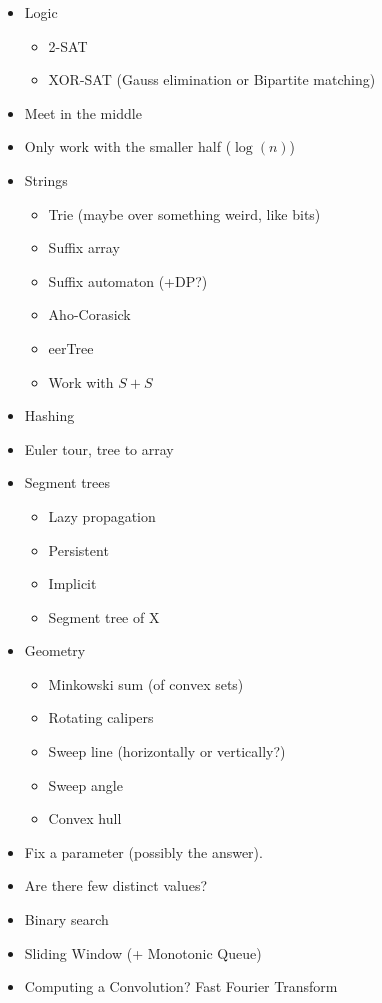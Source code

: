\documentclass[9pt,a4paper,landscape,oneside]{amsart}
\newenvironment{myitemize}
{\begin{itemize}[leftmargin=.3cm]
	\setlength{\itemsep}{0pt}
	\setlength{\parskip}{0pt}
	\setlength{\parsep}{0pt}     }
{ \end{itemize}                  }
\begin{document}
\begin{multicols*}{3}
\begin{myitemize}
\begin{myitemize}
		\end{myitemize}
	\item Logic
		\begin{myitemize}
			\item 2-SAT
			\item XOR-SAT (Gauss elimination or Bipartite matching)
		\end{myitemize}
	\item Meet in the middle
	\item Only work with the smaller half ($\log(n)$)
	\item Strings
		\begin{myitemize}
			\item Trie (maybe over something weird, like bits)
			\item Suffix array
			\item Suffix automaton (+DP?)
			\item Aho-Corasick
			\item eerTree
			\item Work with $S+S$
		\end{myitemize}
	\item Hashing
	\item Euler tour, tree to array
	\item Segment trees
		\begin{myitemize}
			\item Lazy propagation
			\item Persistent
			\item Implicit
			\item Segment tree of X
		\end{myitemize}
	\item Geometry
		\begin{myitemize}
			\item Minkowski sum (of convex sets)
			\item Rotating calipers
			\item Sweep line (horizontally or vertically?)
			\item Sweep angle
			\item Convex hull
		\end{myitemize}
	\item Fix a parameter (possibly the answer).
	\item Are there few distinct values?
	\item Binary search
	\item Sliding Window (+ Monotonic Queue)
	\item Computing a Convolution? Fast Fourier Transform

\end{myitemize}
\end{multicols*}
\end{document}
